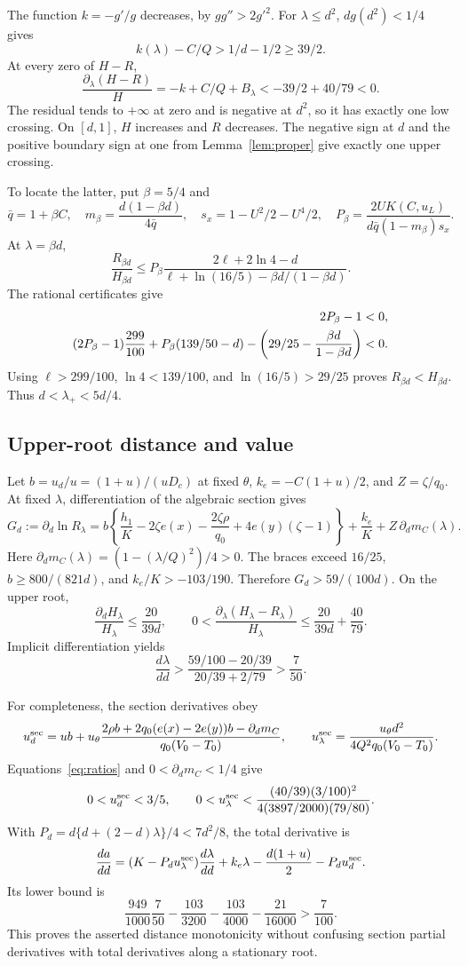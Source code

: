 \documentclass[12pt,letterpaper,onecolumn]{article}
\theoremstyle{definition}
\begin{document}
The function \(k=-g'/g\) decreases, by \(gg''>2g'^2\).
For \(\lambda\le d^2\), \(dg(d^2)<1/4\) gives
\[
k(\lambda)-C/Q>1/d-1/2\ge39/2.
\]
At every zero of \(H-R\),
\[
\frac{\partial_\lambda(H-R)}H=-k+C/Q+B_\lambda
<-39/2+40/79<0.
\]
The residual tends to \(+\infty\) at zero and is negative at \(d^2\), so it has exactly one low crossing.
On \([d,1]\), \(H\) increases and \(R\) decreases. The negative sign at \(d\) and the positive boundary sign at one from Lemma~\ref{lem:proper} give exactly one upper crossing.

To locate the latter, put \(\beta=5/4\) and
\[
\bar q=1+\beta C,\quad
m_\beta=\frac{d(1-\beta d)}{4\bar q},\quad
s_x=1-U^2/2-U^4/2,\quad
P_\beta=\frac{2UK(C,u_L)}{d\bar q(1-m_\beta)s_x}.
\]
At \(\lambda=\beta d\),
\[
\frac{R_{\beta d}}{H_{\beta d}}
\le P_\beta
\frac{2\ell+2\ln4-d}
{\ell+\ln(16/5)-\beta d/(1-\beta d)}.
\]
The rational certificates give
\begin{align}
2P_\beta-1&<0,\notag\\
(2P_\beta-1)\frac{299}{100}
+P_\beta(139/50-d)
-\left(29/25-\frac{\beta d}{1-\beta d}\right)&<0.\label{eq:uppercert}
\end{align}
Using \(\ell>299/100\), \(\ln4<139/100\), and \(\ln(16/5)>29/25\) proves \(R_{\beta d}<H_{\beta d}\).
Thus \(d<\lambda_+<5d/4\).

\subsection{Upper-root distance and value}
Let \(b=u_d/u=(1+u)/(uD_c)\) at fixed \(\theta\), \(k_e=-C(1+u)/2\), and \(Z=\zeta/q_0\).
At fixed \(\lambda\), differentiation of the algebraic section gives
\[
G_d:=\partial_d\ln R_\lambda
=b\left\{\frac{h_1}{K}-2\zeta e(x)-\frac{2\zeta\rho}{q_0}
+4e(y)(\zeta-1)\right\}
+\frac{k_e}{K}+Z\,\partial_dm_C(\lambda).
\]
Here \(\partial_dm_C(\lambda)=(1-(\lambda/Q)^2)/4>0\).
The braces exceed \(16/25\), \(b\ge800/(821d)\), and
\(k_e/K>-103/190\). Therefore \(G_d>59/(100d)\).
On the upper root,
\[
\frac{\partial_dH_\lambda}{H_\lambda}\le\frac{20}{39d},\qquad
0<\frac{\partial_\lambda(H_\lambda-R_\lambda)}{H_\lambda}
\le\frac{20}{39d}+\frac{40}{79}.
\]
Implicit differentiation yields
\[
\frac{d\lambda}{dd}>
\frac{59/100-20/39}{20/39+2/79}>\frac7{50}.
\]

For completeness, the section derivatives obey
\[
u_d^{\rm sec}=ub+
u_\theta\frac{2\rho b+2q_0(e(x)-2e(y))b-\partial_dm_C}
{q_0(V_0-T_0)},\qquad
u_\lambda^{\rm sec}
=\frac{u_\theta d^2}{4Q^2q_0(V_0-T_0)}.
\]
Equations~\eqref{eq:ratios} and \(0<\partial_dm_C<1/4\) give
\[
0<u_d^{\rm sec}<3/5,\qquad
0<u_\lambda^{\rm sec}<
\frac{(40/39)(3/100)^2}{4(3897/2000)(79/80)}.
\]
With \(P_d=d\{d+(2-d)\lambda\}/4<7d^2/8\), the total derivative is
\[
\frac{da}{dd}
=(K-P_du_\lambda^{\rm sec})\frac{d\lambda}{dd}
+k_e\lambda-\frac{d(1+u)}2-P_du_d^{\rm sec}.
\]
Its lower bound is
\[
\frac{949}{1000}\frac7{50}
-\frac{103}{3200}-\frac{103}{4000}-\frac{21}{16000}
>\frac7{100}.
\]
This proves the asserted distance monotonicity without confusing section partial derivatives with total derivatives along a stationary root.
\end{document}
